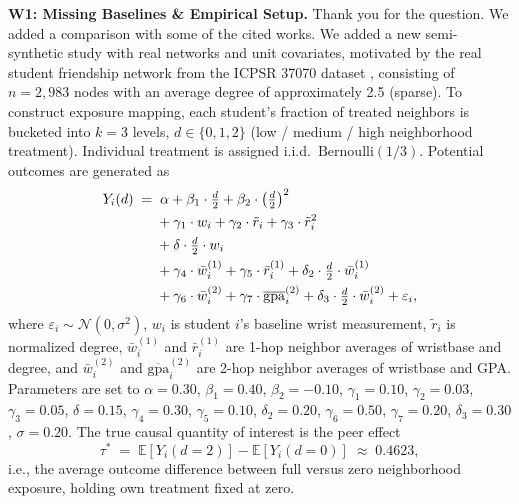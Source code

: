 \documentclass{article}
\theoremstyle{plain}
\theoremstyle{definition}
\theoremstyle{remark}
\begin{document}
\vspace{0.5em}
\noindent\textbf{W1: Missing Baselines \& Empirical Setup.}
Thank you for the question. We added a comparison with some of the cited works. We added a new semi-synthetic study with real networks and unit covariates, motivated by the real student friendship network from the ICPSR 37070 dataset
\citep{aronow2017estimating}, consisting of $n = 2{,}983$ nodes with an average
degree of approximately 2.5 (sparse). To construct exposure mapping, each student's fraction of treated neighbors is bucketed into $k = 3$ levels,
$d \in \{0, 1, 2\}$ (low / medium / high neighborhood treatment). Individual
treatment is assigned i.i.d.\ $\mathrm{Bernoulli}(1/3)$. 
Potential outcomes are generated as
\begin{align}
  Y_i(d) \;=\;
    &\;\alpha
     + \beta_1 \cdot \tfrac{d}{2}
     + \beta_2 \cdot \bigl(\tfrac{d}{2}\bigr)^2 \notag \\
    &+ \gamma_1 \cdot w_i
     + \gamma_2 \cdot \tilde{r}_i
     + \gamma_3 \cdot \tilde{r}_i^2 \notag \\
    &+ \delta \cdot \tfrac{d}{2} \cdot w_i \notag \\
    &+ \gamma_4 \cdot \bar{w}_i^{(1)}
     + \gamma_5 \cdot \bar{r}_i^{(1)}
     + \delta_2 \cdot \tfrac{d}{2} \cdot \bar{w}_i^{(1)} \notag \\
    &+ \gamma_6 \cdot \bar{w}_i^{(2)}
     + \gamma_7 \cdot \overline{\mathrm{gpa}}_i^{(2)}
     + \delta_3 \cdot \tfrac{d}{2} \cdot \bar{w}_i^{(2)}
     + \varepsilon_i, \label{eq:dgp}
\end{align}
where $\varepsilon_i \sim \mathcal{N}(0, \sigma^2)$,
$w_i$ is student $i$'s baseline wrist measurement,
$\tilde{r}_i$ is normalized degree,
$\bar{w}_i^{(1)}$ and $\bar{r}_i^{(1)}$ are 1-hop neighbor averages of
wristbase and degree, and $\bar{w}_i^{(2)}$ and
$\overline{\mathrm{gpa}}_i^{(2)}$ are 2-hop neighbor averages of wristbase and
GPA. Parameters are set to
$\alpha=0.30$, $\beta_1=0.40$, $\beta_2=-0.10$,
$\gamma_1=0.10$, $\gamma_2=0.03$, $\gamma_3=0.05$,
$\delta=0.15$, $\gamma_4=0.30$, $\gamma_5=0.10$, $\delta_2=0.20$,
$\gamma_6=0.50$, $\gamma_7=0.20$, $\delta_3=0.30$, $\sigma=0.20$. 
The true causal quantity of interest is the peer effect
\begin{equation}
  \tau^* \;=\; \mathbb{E}[Y_i(d{=}2)] - \mathbb{E}[Y_i(d{=}0)]
         \;\approx\; 0.4623,
\end{equation}
i.e., the average outcome difference between full versus zero neighborhood
exposure, holding own treatment fixed at zero.
\end{document}
